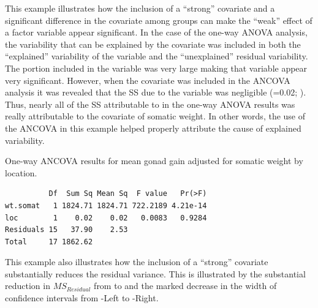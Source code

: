 \documentclass[10pt,openany]{book}\usepackage[]{graphicx}\usepackage[]{color}
\makeatletter
\newenvironment{kframe}{%
 \def\at@end@of@kframe{}%
 \ifinner\ifhmode%
  \def\at@end@of@kframe{\end{minipage}}%
  \begin{minipage}{\columnwidth}%
 \fi\fi%
 \def\FrameCommand##1{\hskip\@totalleftmargin \hskip-\fboxsep
 \colorbox{shadecolor}{##1}\hskip-\fboxsep
     \hskip-\linewidth \hskip-\@totalleftmargin \hskip\columnwidth}%
 \MakeFramed {\advance\hsize-\width
   \@totalleftmargin\z@ \linewidth\hsize
   \@setminipage}}%
 {\par\unskip\endMakeFramed%
 \at@end@of@kframe}
\newenvironment{knitrout}{}{} %
\makeatother
\begin{document}
This example illustrates how the inclusion of a ``strong'' covariate and a significant difference in the covariate among groups can make the ``weak'' effect of a factor variable appear significant.  In the case of the one-way ANOVA analysis, the variability that can be explained by the covariate was included in both the ``explained'' variability of the  variable and the ``unexplained'' residual variability.  The portion included in the  variable was very large making that variable appear very significant.  However, when the covariate was included in the ANCOVA analysis it was revealed that the SS due to the  variable was negligible (=0.02; ).  Thus, nearly all of the SS attributable to  in the one-way ANOVA results was really attributable to the covariate of somatic weight.  In other words, the use of the ANCOVA in this example helped properly attribute the cause of explained variability.

\begin{table}[h]
  \centering
  \caption{One-way ANCOVA results for mean gonad gain adjusted for somatic weight by location.}\label{tab:IVRANCOVAEx2Res2}
\begin{knitrout}
\color{fgcolor}\begin{kframe}
\begin{verbatim}
          Df  Sum Sq Mean Sq  F value   Pr(>F)
wt.somat   1 1824.71 1824.71 722.2189 4.21e-14
loc        1    0.02    0.02   0.0083   0.9284
Residuals 15   37.90    2.53                  
Total     17 1862.62                          
\end{verbatim}
\end{kframe}
\end{knitrout}
\end{table}


This example also illustrates how the inclusion of a ``strong'' covariate substantially reduces the residual variance.  This is illustrated by the substantial reduction in $MS_{Residual}$ from  to  and the marked decrease in the width of confidence intervals from -Left to -Right.
\end{document}
